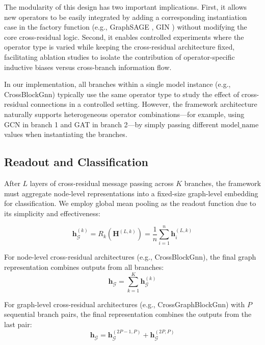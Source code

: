 The modularity of this design has two important implications. First, it allows new operators to be easily integrated by adding a corresponding instantiation case in the factory function (e.g., GraphSAGE \cite{hamilton2017inductive}, GIN \cite{xu2018powerful}) without modifying the core cross-residual logic. Second, it enables controlled experiments where the operator type is varied while keeping the cross-residual architecture fixed, facilitating ablation studies to isolate the contribution of operator-specific inductive biases versus cross-branch information flow.

In our implementation, all branches within a single model instance (e.g., CrossBlockGnn) typically use the same operator type to study the effect of cross-residual connections in a controlled setting. However, the framework architecture naturally supports heterogeneous operator combinations—for example, using GCN in branch 1 and GAT in branch 2—by simply passing different $\text{model_name}$ values when instantiating the branches.

\subsection{Readout and Classification}

After $L$ layers of cross-residual message passing across $K$ branches, the framework must aggregate node-level representations into a fixed-size graph-level embedding for classification. We employ global mean pooling as the readout function due to its simplicity and effectiveness:

\begin{equation}
\mathbf{h}_{\mathcal{G}}^{(k)} = R_k\left(\mathbf{H}^{(L, k)}\right) = \frac{1}{n}\sum_{i=1}^{n} \mathbf{h}_i^{(L, k)}
\end{equation}

For node-level cross-residual architectures (e.g., CrossBlockGnn), the final graph representation combines outputs from all branches:
\begin{equation}
\mathbf{h}_{\mathcal{G}} = \sum_{k=1}^{K} \mathbf{h}_{\mathcal{G}}^{(k)}
\end{equation}

For graph-level cross-residual architectures (e.g., CrossGraphBlockGnn) with $P$ sequential branch pairs, the final representation combines the outputs from the last pair:
\begin{equation}
\mathbf{h}_{\mathcal{G}} = \mathbf{h}_{\mathcal{G}}^{(2P-1, P)} + \mathbf{h}_{\mathcal{G}}^{(2P, P)}
\end{equation}

